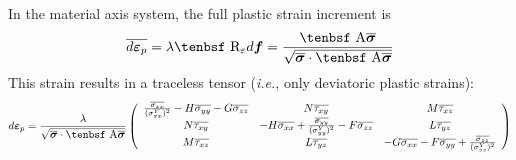 \documentclass[11pt]{article}
\renewcommand{\vec}[1]{\boldsymbol{#1}}
\def\A{\hbox{\tenbsf A}}
\def\dpl{d \vec{\varepsilon}_{p}}
\def\df{d \vec{f}}
\def\R{\hbox{\tenbsf R}}
\def\s#1{\sigma_{#1}}
\def\t#1{\tau_{#1}}
\begin{document}
In the material axis system, the full plastic strain increment is
\begin{equation}
       \overline{\dpl} = \lambda \R_\varepsilon\df = {\A \overline{\vec\sigma}\over\sqrt{\overline{\vec\sigma} \cdot \A \overline{\vec\sigma}}}
\end{equation}
This strain results in a traceless tensor ({\em i.e.}, only deviatoric plastic strains):
\begin{equation}
         \dpl = {\lambda\over \sqrt{\overline{\vec\sigma} \cdot \A \overline{\vec\sigma}}}
         \left( \begin{array}{ccc}
                      {\overline{\s{xx}}\over (\s{xx}^Y)^2} - H\overline{\s{yy}} - G\overline{\s{zz}} & N\overline{\t{xy}} & M\overline{\t{xz}} \\
                       N\overline{\t{xy}} & -H\overline{\s{xx}} + {\overline{\s{yy}}\over (\s{yy}^Y)^2} - F\overline{\s{zz}} & L\overline{\t{yz}}  \\
                       M\overline{\t{xz}} & L\overline{\t{yz}} & -G\overline{\s{xx}} -F\overline{\s{yy}} +{\overline{\s{zz}}\over (\s{zz}^Y)^2} 
                        \end{array} \right)
\end{equation}
\end{document}
